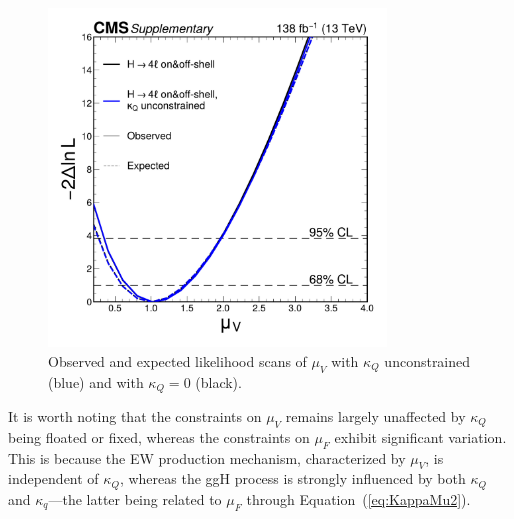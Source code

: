 \begin{figure}[!hbt]
    \centering
    \includegraphics[width=0.8\textwidth]{figures/observed_muV.pdf}
    \caption{Observed and expected likelihood scans of $\mu_V$ with $\kappa_Q$ unconstrained (blue) and with $\kappa_Q=0$ (black).}
    \label{fig:kappa_muV_scan}
\end{figure}

It is worth noting that the constraints on $\mu_V$ remains largely unaffected by $\kappa_Q$ being floated or fixed, whereas the constraints on $\mu_F$ exhibit significant variation. This is because the EW production mechanism, characterized by $\mu_V$, is independent of $\kappa_Q$, whereas the ggH process is strongly influenced by both $\kappa_Q$ and $\kappa_q$---the latter being related to $\mu_F$ through Equation~(\ref{eq:KappaMu2}).



